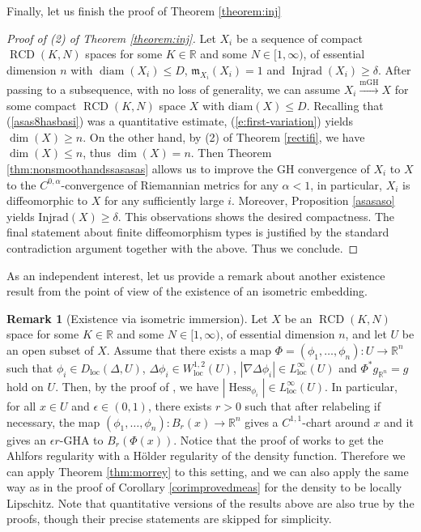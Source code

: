 \documentclass[11pt,reqno]{amsart}
\theoremstyle{definition}
\newtheorem{remark}[theorem]{Remark}
\numberwithin{equation}{section}
\newcommand{\meas}{\mathfrak{m}}
\DeclareMathOperator{\diam}{diam}
\DeclareMathOperator{\Hess}{Hess}
\DeclareMathOperator{\Injrad}{Injrad}
\DeclareMathOperator{\loc}{loc}
\DeclareMathOperator{\RCD}{RCD}
\begin{document}
Finally, let us finish the proof of Theorem \ref{theorem:inj}
\begin{proof}[Proof of (2) of Theorem \ref{theorem:inj}]
Let $X_i$ be a sequence of compact $\RCD(K, N)$ spaces for some $K \in \mathbb{R}$ and some $N \in [1, \infty)$, of essential dimension $n$ with $\diam (X_i)\le D$, $\meas_{X_i}(X_i)=1$ and
$
\Injrad(X_i)\ge \delta.
$
After passing to a subsequence, with no loss of generality, we can assume $X_i \stackrel{\mathrm{mGH}}{\to} X$ for some compact $\RCD(K, N)$ space $X$ with $\mathrm{diam}(X)\le D$. 
Recalling that (\ref{asas8hasbasi}) was a quantitative estimate, (\ref{e:first-variation}) yields $\dim(X) \ge n$. On the other hand, by (2) of Theorem \ref{rectifi}, we have $\dim(X) \le n$, thus $\dim(X)=n$. 
Then Theorem \ref{thm:nonsmoothandssasasas} allows us to improve the GH convergence of $X_i$ to $X$ to the $C^{0,\alpha}$-convergence of Riemannian metrics for any $\alpha<1$, in particular, $X_i$ is diffeomorphic to $X$ for any sufficiently large $i$. Moreover, Proposition \ref{asasaso} yields $\mathrm{Injrad}(X)\ge \delta$. 
This observations shows the desired compactness. The final statement about finite diffeomorphism types is justified by the standard contradiction argument together with the above. Thus we conclude.
\end{proof}
As an independent interest, let us provide a remark about another existence result from the point of view of the existence of an isometric embedding.
\begin{remark}[Existence via isometric immersion]\label{ismee}  
    Let $X$ be an $\RCD(K, N)$ space for some $K \in \mathbb{R}$ and some $N \in [1, \infty)$, of essential dimension $n$, and let $U$ be an open subset of $X$. Assume that there exists a  map $\Phi=(\phi_1, \ldots, \phi_n):U \to \mathbb{R}^n$ such that  $\phi_i \in D_{\loc}(\Delta, U)$, $\Delta \phi_i \in W^{1,2}_{\loc}(U)$, $|\nabla \Delta \phi_i| \in L^{\infty}_{\loc}(U)$
     and $\Phi^*g_{\mathbb{R}^n}=g$ hold on $U$. 
    Then, by the proof of \cite[Lemma 4.6]{ZHuang},    
    we have 
    $|\Hess_{\phi_i}|\in L^{\infty}_{\loc}(U)$. 
    In particular, for all $x \in U$ and $\epsilon \in (0, 1)$, there exists $r>0$ such that after relabeling if necessary,  the map $(\phi_1, \ldots, \phi_n):B_r(x) \to \mathbb{R}^n$ gives a $C^{1,1}$-chart around $x$ and it gives an $\epsilon r$-GHA to $B_r(\Phi(x))$. Notice that the proof of \cite[Theorem 4.6]{Cheeger-Colding-III} works to get the Ahlfors regularity with a H\"older regularity of the density function. Therefore we can apply Theorem \ref{thm:morrey} to this setting, and we can also apply the same way as in the proof of Corollary \ref{corimprovedmeas} for the density to be locally Lipschitz. Note that quantitative versions of the results above are also true by the proofs, though their precise statements are skipped for simplicity.
\end{remark}
\end{document}

